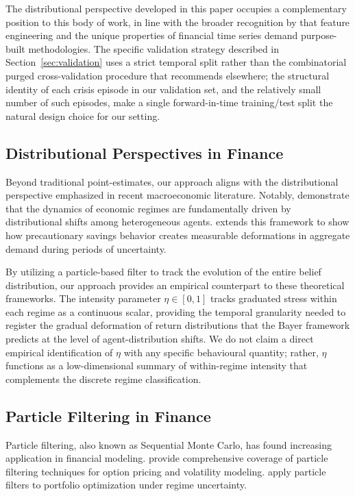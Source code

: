 \documentclass[11pt]{article}
\begin{document}
The distributional perspective developed in this paper occupies a
complementary position to this body of work, in line with the broader
recognition by \citet{Prado2018,Prado2020} that feature engineering and
the unique properties of financial time series demand purpose-built
methodologies. The specific validation strategy described in
Section~\ref{sec:validation} uses a strict temporal split rather than
the combinatorial purged cross-validation procedure that
\citet{Prado2018} recommends elsewhere; the structural identity of each
crisis episode in our validation set, and the relatively small number of
such episodes, make a single forward-in-time training/test split the
natural design choice for our setting.

\subsection{Distributional Perspectives in Finance}

Beyond traditional point-estimates, our approach aligns with the
distributional perspective emphasized in recent macroeconomic
literature. Notably, \citet{Bayer2019} demonstrate that the dynamics of
economic regimes are fundamentally driven by distributional shifts among
heterogeneous agents. \citet{Bayer2020} extends this framework to show
how precautionary savings behavior creates measurable deformations in
aggregate demand during periods of uncertainty.

By utilizing a particle-based filter to track the evolution of the
entire belief distribution, our approach provides an empirical
counterpart to these theoretical frameworks. The intensity parameter
$\eta \in [0,1]$ tracks graduated stress within each regime as a
continuous scalar, providing the temporal granularity needed to register
the gradual deformation of return distributions that the Bayer framework
predicts at the level of agent-distribution shifts. We do not claim a
direct empirical identification of $\eta$ with any specific behavioural
quantity; rather, $\eta$ functions as a low-dimensional summary of
within-regime intensity that complements the discrete regime
classification.

\subsection{Particle Filtering in Finance}

Particle filtering, also known as Sequential Monte Carlo, has found
increasing application in financial modeling. \citet{Johannes2009}
provide comprehensive coverage of particle filtering techniques for
option pricing and volatility modeling. \citet{Malik2005} apply particle
filters to portfolio optimization under regime uncertainty.
\end{document}
